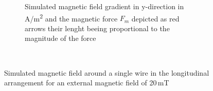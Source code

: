 \begin{figure}[H]
\begin{subfigure}{0.49\textwidth}
                \caption{Simulated magnetic field gradient in y-direction in A/m\textsuperscript{2} and the magnetic force $F_{m}$ depicted as red arrows their lenght beeing proportional to the magnitude of the force}\label{fig:mag_force_sw}
        \end{subfigure}
        \\
        
        \caption[Simulated magnetic field around a single wire]{Simulated magnetic field around a single wire in the longitudinal arrangement for an external magnetic field of 20\,mT}
        \label{fig:sw_fm_mag_field}
  \end{figure}

% 

